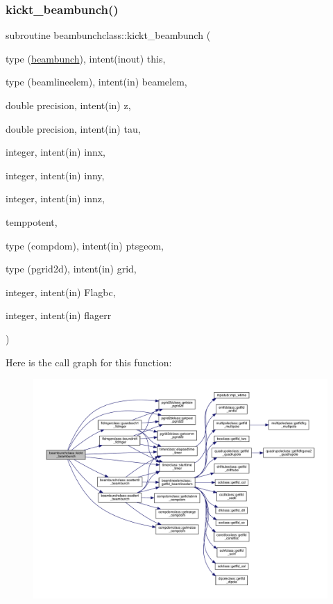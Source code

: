 \subsubsection{\texorpdfstring{kickt\_beambunch()}{kickt\_beambunch()}}
{\footnotesize\ttfamily subroutine beambunchclass\+::kickt\+\_\+beambunch (\begin{DoxyParamCaption}\item[{type (\mbox{\hyperlink{namespacebeambunchclass_structbeambunchclass_1_1beambunch}{beambunch}}), intent(inout)}]{this,  }\item[{type (beamlineelem), intent(in)}]{beamelem,  }\item[{double precision, intent(in)}]{z,  }\item[{double precision, intent(in)}]{tau,  }\item[{integer, intent(in)}]{innx,  }\item[{integer, intent(in)}]{inny,  }\item[{integer, intent(in)}]{innz,  }\item[{}]{temppotent,  }\item[{type (compdom), intent(in)}]{ptsgeom,  }\item[{type (pgrid2d), intent(in)}]{grid,  }\item[{integer, intent(in)}]{Flagbc,  }\item[{integer, intent(in)}]{flagerr }\end{DoxyParamCaption})}

Here is the call graph for this function\+:\nopagebreak
\begin{figure}[H]
\begin{center}
\leavevmode
\includegraphics[width=350pt]{namespacebeambunchclass_a119b1d68c4a2a790014a9408c2db1575_cgraph}
\end{center}
\end{figure}
\mbox{\label{namespacebeambunchclass_a618f97b46c83d8ca29a7cb05345d655e}} 
